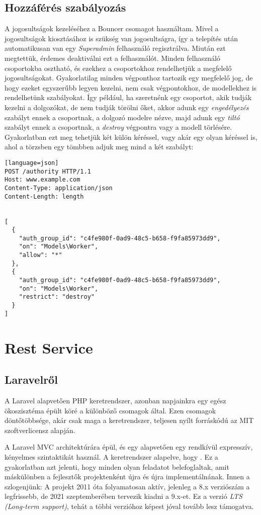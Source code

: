 \documentclass[a4paper,12pt]{thesis-ekf}
\theoremstyle{definition}
\begin{document}
		\section{Hozzáférés szabályozás}
			A jogosultságok kezeléséhez a Bouncer csomagot használtam. Mivel a jogosultságok kiosztásához is szükség van jogosultságra, így a telepítés után automatikusan van egy \emph{Superadmin} felhasználó regisztrálva. Miután  ezt megtettük, érdemes deaktiválni ezt a felhasználót. Minden felhasználó csoportokba osztható, és ezekhez a csoportokhoz rendelhetjük a megfelelő jogosultságokat. Gyakorlatilag minden végponthoz tartozik egy megfelelő jog, de hogy ezeket egyszerűbb legyen kezelni, nem csak végpontokhoz, de modellekhez is rendelhetünk szabályokat. Így például, ha szeretnénk egy csoportot, akik tudják kezelni a dolgozókat, de nem tudják törölni őket, akkor adunk egy \emph{engedélyezés} szabályt ennek a csoportnak, a dolgozó modelre nézve, majd adunk egy \emph{tiltó} szabályt ennek a csoportnak, a \emph{destroy} végpontra vagy a modell törlésére. Gyakorlatban ezt meg tehetjük két külön kéréssel, vagy akár egy olyan kéréssel is, ahol a törzsben egy tömbben adjuk meg mind a két szabályt:
			
			\begin{lstlisting}[caption={Példa a jogosultság kezelésre}][language=json]
POST /authority HTTP/1.1
Host: www.example.com
Content-Type: application/json
Content-Length: length


[
  {
    "auth_group_id": "c4fe980f-0ad9-48c5-b658-f9fa85973dd9",
    "on": "Models\Worker",
    "allow": "*"
  },
  {
    "auth_group_id": "c4fe980f-0ad9-48c5-b658-f9fa85973dd9",
    "on": "Models\Worker",
    "restrict": "destroy"
  }
]
			\end{lstlisting}
			
	\chapter{Rest Service}

		\section{Laravelről}
			A Laravel alapvetően PHP keretrendszer, azonban napjainkra egy egész ökoszisztéma épült köré a különböző csomagok által. Ezen csomagok döntőtöbbsége, akár csak maga a keretrendszer, teljesen nyílt forráskódú az MIT szoftverlicensz alapján.
			
			A Laravel MVC architektúrára épül, és egy alapvetően egy rendkívül expresszív, kényelmes szintaktikát használ. A keretrendszer alapelve, hogy . Ez a gyakorlatban azt jelenti, hogy minden olyan feladatot belefoglaltak, amit máskülönben a fejlesztők projektenként újra és újra implementálnának. Innen a szlogenjünk:  A projekt 2011 óta folyamatosan aktív, jelenleg a 8.x verziószám a legfrissebb, de 2021 szeptemberében tervezik kiadni a 9.x-et. Ez a verzió \emph{LTS (Long-term support)}, tehát a többi verzióhoz képest jóval tovább lesz támogatva.
			
\end{document}

